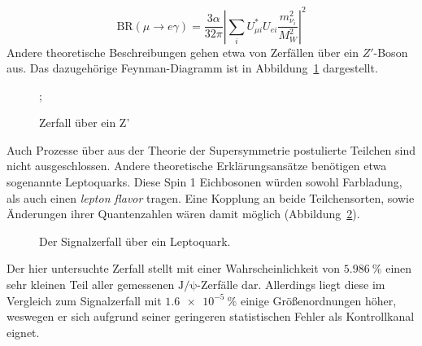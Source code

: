 %
\begin{equation}\label{eq:BRmuega}
  \text{BR}(\mu\rightarrow e\gamma)=\frac{3\alpha}{32\pi}\left|\sum_i U_{\mu i}^*U_{ei}\frac{m^2_{\nu_i}}{M^2_W}\right|^2
\end{equation}
%
Andere theoretische Beschreibungen gehen etwa von Zerfällen über ein $Z'$-Boson aus\cite{zprime}. Das dazugehörige Feynman-Diagramm ist in Abbildung~\ref{fig:Zprime} dargestellt.
%
\begin{figure}
  \centering
  ;
\caption{Zerfall über ein Z'}
\label{fig:Zprime}
\end{figure}
%
Auch Prozesse über aus der Theorie der Supersymmetrie postulierte Teilchen sind nicht ausgeschlossen\cite{susy_gut1}\cite{susy_gut2}. Andere theoretische Erklärungsansätze benötigen etwa sogenannte Leptoquarks. Diese Spin 1 Eichbosonen würden sowohl Farbladung, als auch einen \textit{lepton flavor} tragen. Eine Kopplung an beide Teilchensorten, sowie Änderungen ihrer Quantenzahlen wären damit möglich (Abbildung~\ref{fig:lepto}).
%
\begin{figure}[H]
  \centering
    \caption{Der Signalzerfall über ein Leptoquark.}
    \label{fig:lepto}
  \end{figure}
%
Der hier untersuchte Zerfall \kontroll stellt mit einer Wahrscheinlichkeit von $\SI{5,986}{\percent}$ einen sehr kleinen Teil aller gemessenen $\mathrm{J/\!\psi}$-Zerfälle dar\cite{pdg}. Allerdings liegt diese im Vergleich zum Signalzerfall \signal mit $\SI{1,6e-5}{\percent}$ einige Größenordnungen höher\cite{pdg}, weswegen er sich aufgrund seiner geringeren statistischen Fehler als Kontrollkanal eignet.
